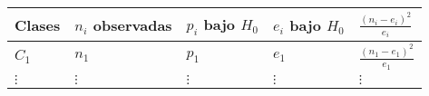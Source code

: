 \documentclass[
]{book}
\theoremstyle{break}
\theoremstyle{definition}
\theoremstyle{definition}
\theoremstyle{definition}
\theoremstyle{remark}
\begin{document}
\begin{longtable}[]{@{}lllll@{}}
\toprule
\begin{minipage}[b]{0.06\columnwidth}\raggedright
Clases\strut
\end{minipage} & \begin{minipage}[b]{0.17\columnwidth}\raggedright
\(n_{i}\) observadas\strut
\end{minipage} & \begin{minipage}[b]{0.17\columnwidth}\raggedright
\(p_{i}\) bajo \(H_0\)\strut
\end{minipage} & \begin{minipage}[b]{0.17\columnwidth}\raggedright
\(e_{i}\) bajo \(H_0\)\strut
\end{minipage} & \begin{minipage}[b]{0.29\columnwidth}\raggedright
\(\frac{(n_{i}-e_{i})^2}{e_{i}}\)\strut
\end{minipage}\tabularnewline
\midrule
\endhead
\begin{minipage}[t]{0.06\columnwidth}\raggedright
\(C_1\)\strut
\end{minipage} & \begin{minipage}[t]{0.17\columnwidth}\raggedright
\(n_1\)\strut
\end{minipage} & \begin{minipage}[t]{0.17\columnwidth}\raggedright
\(p_1\)\strut
\end{minipage} & \begin{minipage}[t]{0.17\columnwidth}\raggedright
\(e_1\)\strut
\end{minipage} & \begin{minipage}[t]{0.29\columnwidth}\raggedright
\(\frac{(n_1-e_1)^2}{e_1}\)\strut
\end{minipage}\tabularnewline
\begin{minipage}[t]{0.06\columnwidth}\raggedright
\(\vdots\)\strut
\end{minipage} & \begin{minipage}[t]{0.17\columnwidth}\raggedright
\(\vdots\)\strut
\end{minipage} & \begin{minipage}[t]{0.17\columnwidth}\raggedright
\(\vdots\)\strut
\end{minipage} & \begin{minipage}[t]{0.17\columnwidth}\raggedright
\(\vdots\)\strut
\end{minipage} & \begin{minipage}[t]{0.29\columnwidth}\raggedright
\(\vdots\)\strut
\end{minipage}\tabularnewline

\end{longtable}
\end{document}
